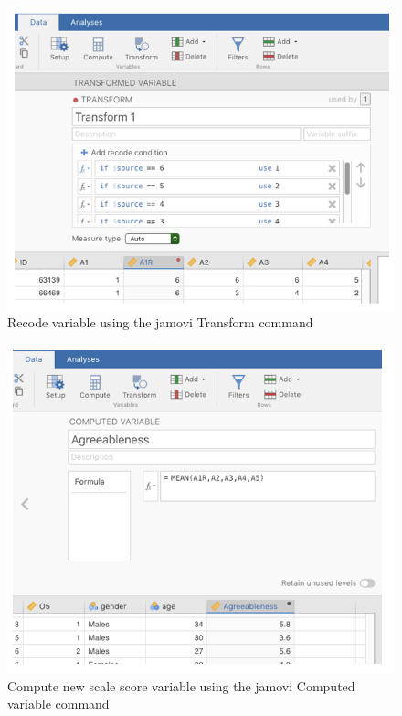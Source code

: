 \documentclass[
]{book}
\begin{document}
\begin{figure}

{\centering \includegraphics[width=1\linewidth]{img/factoranalysis/fa8} 

}

\caption{Recode variable using the jamovi Transform command}\label{fig:fa8}
\end{figure}

\begin{figure}

{\centering \includegraphics[width=1\linewidth]{img/factoranalysis/fa9} 

}

\caption{Compute new scale score variable using the jamovi Computed variable command}\label{fig:fa9}
\end{figure}
\end{document}
